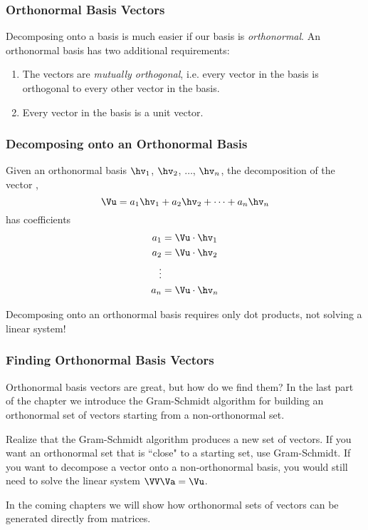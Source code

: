 \documentclass{beamer}
\begin{document}
\begin{frame}
\frametitle{Orthonormal Basis Vectors}

Decomposing onto a basis is much easier if our basis is \emph{orthonormal}. An orthonormal basis has two additional requirements:
\begin{enumerate}
	\item The vectors are \emph{mutually orthogonal}, i.e. every vector in the basis is orthogonal to every other vector in the basis.
	\item Every vector in the basis is a unit vector.
\end{enumerate}
\end{frame}

\begin{frame}
\frametitle{Decomposing onto an Orthonormal Basis}

Given an orthonormal basis $\hv_1$, $\hv_2$, $\ldots$, $\hv_n$, the decomposition of the vector \Vu,
\[ \Vu = a_1\hv_1 + a_2\hv_2 + \cdots + a_n\hv_n \]
has coefficients
\begin{align*}
	a_1 &= \Vu\cdot\hv_1 \\
	a_2 &= \Vu\cdot\hv_2 \\
	\vdots \\
	a_n &= \Vu\cdot\hv_n
\end{align*}

Decomposing onto an orthonormal basis requires only dot products, not solving a linear system!
\end{frame}

\begin{frame}
\frametitle{Finding Orthonormal Basis Vectors}

Orthonormal basis vectors are great, but how do we find them? In the last part of the chapter we introduce the Gram-Schmidt algorithm for building an orthonormal set of vectors starting from a non-orthonormal set.

\medskip
Realize that the Gram-Schmidt algorithm produces a new set of vectors. If you want an orthonormal set that is ``close" to a starting set, use Gram-Schmidt. If you want to decompose a vector onto a non-orthonormal basis, you would still need to solve the linear system $\VV\Va=\Vu$.

\medskip
In the coming chapters we will show how orthonormal sets of vectors can be generated directly from matrices.
\end{frame}
\end{document}
